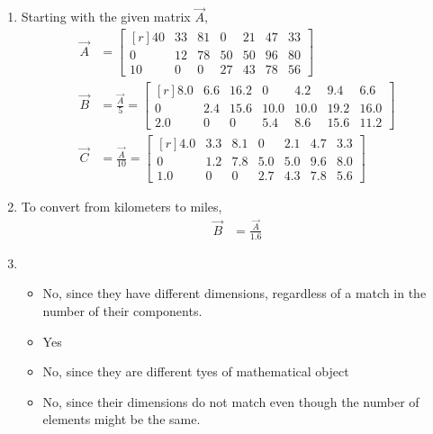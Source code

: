\begin{enumerate}
    \item Starting with the given matrix $ \vec{A} $,
          \begin{align}
              \vec{A} & =
              \begin{bmatrix*}[r]
                  40 & 33 & 81 & 0  & 21 & 47 & 33 \\
                  0  & 12 & 78 & 50 & 50 & 96 & 80 \\
                  10 & 0  & 0  & 27 & 43 & 78 & 56
              \end{bmatrix*}             \\
              \vec{B} & = \frac{\vec{A}}{5} =
              \begin{bmatrix*}[r]
                  8.0 & 6.6 & 16.2 & 0    & 4.2  & 9.4  & 6.6  \\
                  0   & 2.4 & 15.6 & 10.0 & 10.0 & 19.2 & 16.0 \\
                  2.0 & 0   & 0    & 5.4  & 8.6  & 15.6 & 11.2
              \end{bmatrix*} \\
              \vec{C} & = \frac{\vec{A}}{10} =
              \begin{bmatrix*}[r]
                  4.0 & 3.3 & 8.1 & 0   & 2.1 & 4.7 & 3.3 \\
                  0   & 1.2 & 7.8 & 5.0 & 5.0 & 9.6 & 8.0 \\
                  1.0 & 0   & 0   & 2.7 & 4.3 & 7.8 & 5.6
              \end{bmatrix*}
          \end{align}

    \item To convert from kilometers to miles,
          \begin{align}
              \vec{B} & = \frac{\vec{A}}{1.6}
          \end{align}

    \item \begin{itemize}
              \item No, since they have different dimensions, regardless of a match in
                    the number of their components.
              \item Yes
              \item No, since they are different tyes of mathematical object
              \item No, since their dimensions do not match even though the number of
                    elements might be the same.
          \end{itemize}


\end{enumerate}

